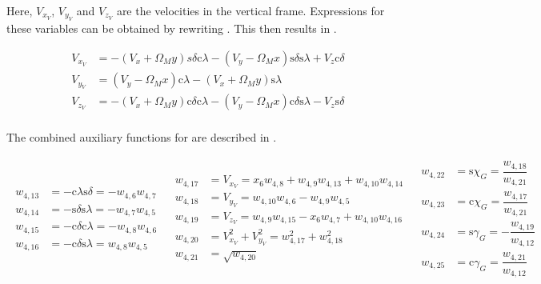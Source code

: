 \noindent
Here, $V_{x_{V}}$, $V_{y_{V}}$ and $V_{z_{V}}$ are the velocities in the vertical frame. Expressions for these variables can be obtained by rewriting . This then results in .


\begin{equation} \label{eq:VV}
\begin{split}
V_{x_{V}} & = -\left(V_{x}+\Omega_{M}y\right) s \delta \text{c}\lambda - \left(V_{y}-\Omega_{M}x\right) \text{s}\delta \text{s}\lambda+V_{z}\text{c}\delta \\
V_{y_{V}} & = \left(V_{y}-\Omega_{M}x\right) \text{c}\lambda - \left(V_{x}+\Omega_{M} y \right) \text{s}\lambda \\
V_{z_{V}} & = -\left(V_{x}+\Omega_{M}y\right)\text{c}\delta \text{c}\lambda-\left(V_{y}-\Omega_{M}x\right) \text{c}\delta \text{s}\lambda - V_{z} \text{s}\delta \\
\end{split}
\end{equation}

\noindent
The combined auxiliary functions for  are described in .

\begin{align} \label{eq:auxVV}
\begin{split}
w_{4,13} &= -\text{c}\lambda \text{s}\delta  = -w_{4,6}w_{4,7} \\
w_{4,14} &= -\text{s}\delta \text{s}\lambda = -w_{4,7}w_{4,5} \\
w_{4,15} &= -\text{c}\delta \text{c}\lambda = -w_{4,8}w_{4,6} \\
w_{4,16} &= -\text{c}\delta \text{s}\lambda = w_{4,8}w_{4,5} \\
\end{split}
&
\begin{split}
w_{4,17} &= V_{x_{V}} = x_{6}w_{4,8}+w_{4,9}w_{4,13}+w_{4,10}w_{4,14} \\
w_{4,18} &= V_{y_{V}} = w_{4,10}w_{4,6}-w_{4,9}w_{4,5} \\
w_{4,19} &= V_{z_{V}} = w_{4,9}w_{4,15}-x_{6}w_{4,7}+w_{4,10}w_{4,16} \\
w_{4,20} &= V_{x_{V}}^{2}+V_{y_{V}}^{2} = w_{4,17}^{2}+w_{4,18}^{2} \\
w_{4,21} &= \sqrt{w_{4,20}} \\
\end{split}
&
\begin{split}
w_{4,22} &= \text{s}\chi_{G} = \dfrac{w_{4,18}}{w_{4,21}} \\
w_{4,23} &= \text{c}\chi_{G} = \dfrac{w_{4,17}}{w_{4,21}} \\
w_{4,24} &= \text{s}\gamma_{G} = -\dfrac{w_{4,19}}{w_{4,12}} \\
w_{4,25} &= \text{c}\gamma_{G} = \dfrac{w_{4,21}}{w_{4,12}} \\
\end{split}
\end{align}



